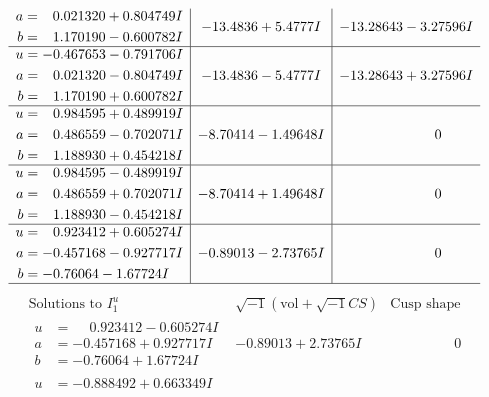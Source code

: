 \documentclass[1p]{elsarticle_modified}
\theoremstyle{definition}
\newcommand{\I}{\sqrt{-1}}
\begin{document}
$$\begin{array}{c|c|c}
\begin{aligned}
a &= \phantom{-}0.021320 + 0.804749 I \\
b &= \phantom{-}1.170190 - 0.600782 I\end{aligned}
 & -13.4836 + 5.4777 I & -13.28643 - 3.27596 I \\ \hline\begin{aligned}
u &= -0.467653 - 0.791706 I \\
a &= \phantom{-}0.021320 - 0.804749 I \\
b &= \phantom{-}1.170190 + 0.600782 I\end{aligned}
 & -13.4836 - 5.4777 I & -13.28643 + 3.27596 I \\ \hline\begin{aligned}
u &= \phantom{-}0.984595 + 0.489919 I \\
a &= \phantom{-}0.486559 - 0.702071 I \\
b &= \phantom{-}1.188930 + 0.454218 I\end{aligned}
 & -8.70414 - 1.49648 I & \phantom{-0.000000 } 0 \\ \hline\begin{aligned}
u &= \phantom{-}0.984595 - 0.489919 I \\
a &= \phantom{-}0.486559 + 0.702071 I \\
b &= \phantom{-}1.188930 - 0.454218 I\end{aligned}
 & -8.70414 + 1.49648 I & \phantom{-0.000000 } 0 \\ \hline\begin{aligned}
u &= \phantom{-}0.923412 + 0.605274 I \\
a &= -0.457168 - 0.927717 I \\
b &= -0.76064 - 1.67724 I\end{aligned}
 & -0.89013 - 2.73765 I & \phantom{-0.000000 } 0\\
 \hline 
 \end{array}$$\newpage$$\begin{array}{c|c|c}  
\text{Solutions to }I^u_{1}& \I (\text{vol} + \sqrt{-1}CS) & \text{Cusp shape}\\
 \hline 
\begin{aligned}
u &= \phantom{-}0.923412 - 0.605274 I \\
a &= -0.457168 + 0.927717 I \\
b &= -0.76064 + 1.67724 I\end{aligned}
 & -0.89013 + 2.73765 I & \phantom{-0.000000 } 0 \\ \hline\begin{aligned}
u &= -0.888492 + 0.663349 I \\

\end{aligned}
\end{array}$$
\end{document}

